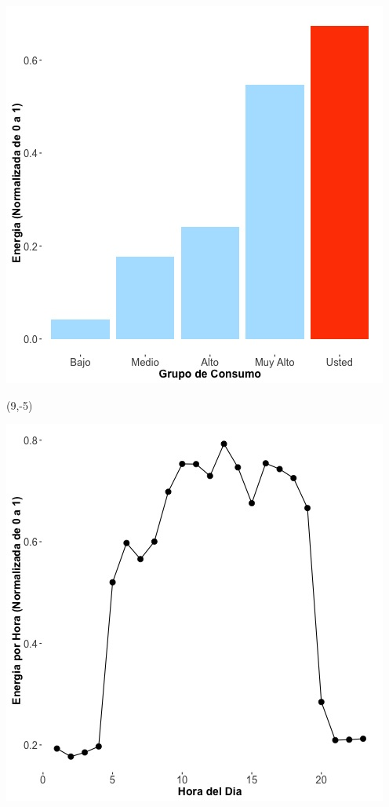 \documentclass{article}\usepackage[]{graphicx}\usepackage[]{color}
\newenvironment{knitrout}{}{} %
\begin{document}
\begin{knitrout}
\color{fgcolor}
\includegraphics[scale=0.65]{figure/A26_neighbor_plot} 
\end{knitrout}

 \begin{textblock}{1}(9,-5)
\begin{minipage}{20em}
\begingroup

\endgroup
\end{minipage}
\end{textblock}


\begin{knitrout}
\color{fgcolor}
\includegraphics[scale=0.65]{figure/A26_plot_norm_median} 
\end{knitrout}
\end{document}
